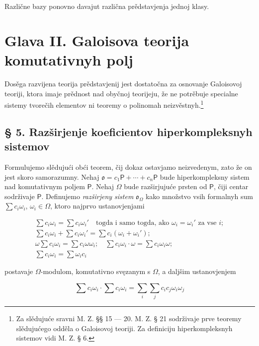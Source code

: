 \documentclass[11pt]{article}
\newcommand{\srcfn}[2]{\footnote{#2}}
\begin{document}
Različne bazy ponovno davajut različna prědstavjenja jednoj klasy.

\section*{Glava II. Galoisova teorija komutativnyh polj}\label{kapitel-ii.-galoissche-theorie-kommutativer-koerper}

Dosěga razvijena teorija prědstavjenij jest dostatočna za osnovanje Galoisovoj teoriji, ktora imaje prědnost nad obyčnoj teorijeju, že ne potrěbuje specialne sistemy tvorečih elementov ni teoremy o polinomah neizvěstnyh.\srcfn{1}{Za slědujuće sravni M. Z. §§ 15 --- 20. M. Z. § 21 sodrživaje prve teoremy slědujućego odděla o Galoisovoj teoriji. Za definiciju hiperkompleksnyh sistemov vidi M. Z. § 6.}

\subsection*{§ 5. Razširjenje koeficientov hiperkompleksnyh sistemov}\label{koeffizientenerweiterung-hyperkomplexer-systeme}

Formulujemo slědujući obći teorem, čij dokaz ostavjamo neizvedenym, zato že on jest skoro samorazumny. Nehaj \(\mathfrak{o}=c_1\mathsf P+\cdots+c_n\mathsf P\) bude hiperkompleksny sistem nad komutativnym poljem \(\mathsf P\). Nehaj \(\Omega\) bude razširjujuće prsten od \(\mathsf P\), čiji centar sodrživaje \(\mathsf P\). Definujemo \emph{razširjeny sistem} \(\mathfrak{o}_{\Omega}\) kako množstvo vsih formalnyh sum \(\sum c_i\omega_i\), \(\omega_i\in\Omega\), ktoro najprvo ustanovjenjami

\[
\begin{array}{l}
\sum c_i\omega_i=\sum c_i\omega_i' \quad\text{togda i samo togda, ako } \omega_i=\omega_i' \text{ za vse } i;\\
\sum c_i\omega_i+\sum c_i\omega_i'=\sum c_i(\omega_i+\omega_i');\\
\omega\sum c_i\omega_i=\sum c_i\omega\omega_i;\quad
\sum c_i\omega_i\cdot\omega=\sum c_i\omega_i\omega;\\
\sum c_i\omega_i=\sum \omega_i c_i
\end{array}
\]

postavaje \(\Omega\)-modulom, komutativno svęzanym s \(\Omega\), a daljšim ustanovjenjem

\[
\sum c_i\omega_i\cdot \sum c_i\omega_i
=\sum_i\sum_j c_ic_j\omega_i\omega_j
\]
\end{document}
